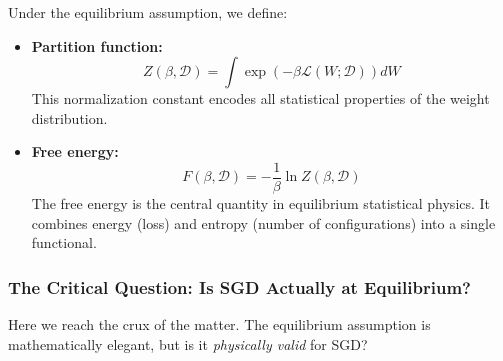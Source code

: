 \documentclass[
  journal=largetwo,
  simfonts=false,
  year=2025,
  volume=37,
]{cup-journal}
\begin{document}
\begin{definition}\label{def:partition_free_energy}
Under the equilibrium assumption, we define:
\begin{itemize}
    \item \textbf{Partition function:}
    \begin{equation}
        Z(\beta, \mathcal{D}) = \int \exp\left( -\beta \mathcal{L}(W; \mathcal{D}) \right) dW
    \end{equation}
    This normalization constant encodes all statistical properties of the weight distribution.
    
    \item \textbf{Free energy:}
    \begin{equation}
        F(\beta, \mathcal{D}) = -\frac{1}{\beta} \ln Z(\beta, \mathcal{D})
    \end{equation}
    The free energy is the central quantity in equilibrium statistical physics. It combines energy (loss) and entropy (number of configurations) into a single functional.
\end{itemize}
\end{definition}

\subsubsection{The Critical Question: Is SGD Actually at Equilibrium?}

Here we reach the crux of the matter. The equilibrium assumption is mathematically elegant, but is it \textit{physically valid} for SGD?
\end{document}

